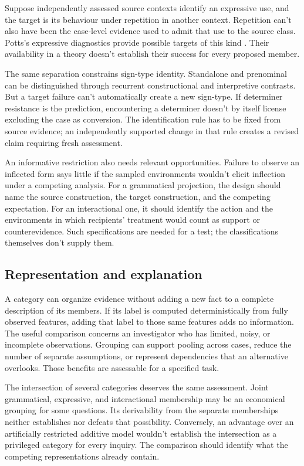 Suppose independently assessed source contexts identify an expressive
use, and the target is its behaviour under repetition in another context.
Repetition can't also have been the case-level evidence used to admit that
use to the source class. Potts's expressive diagnostics provide possible
targets of this kind \citep[166--167]{potts2007}. Their availability in a
theory doesn't establish their success for every proposed member.

The same separation constrains sign-type identity. Standalone and
prenominal  can be distinguished through recurrent
constructional and interpretive contrasts. But a target failure can't
automatically create a new sign-type. If determiner resistance is the
prediction, encountering a determiner doesn't by itself license excluding
the case as conversion. The identification rule has to be fixed from
source evidence; an independently supported change in that rule creates
a revised claim requiring fresh assessment.

An informative restriction also needs relevant opportunities. Failure
to observe an inflected form says little if the sampled environments
wouldn't elicit inflection under a competing analysis. For a grammatical
projection, the design should name the source construction, the target
construction, and the competing expectation. For an interactional one,
it should identify the action and the environments in which recipients'
treatment would count as support or counterevidence. Such specifications
are needed for a test; the classifications themselves don't supply them.

\subsection{Representation and explanation}

A category can organize evidence without adding a new fact to a complete
description of its members. If its label is computed deterministically from
fully observed features, adding that label to those same features adds no
information. The useful comparison concerns an investigator who has limited,
noisy, or incomplete observations. Grouping can support pooling across cases,
reduce the number of separate assumptions, or represent dependencies that
an alternative overlooks. Those benefits are assessable for a specified task.

The intersection of several categories deserves the same assessment.
Joint grammatical, expressive, and interactional membership may be an
economical grouping for some questions. Its derivability from the separate
memberships neither establishes nor defeats that possibility. Conversely,
an advantage over an artificially restricted additive model wouldn't
establish the intersection as a privileged category for every inquiry.
The comparison should identify what the competing representations already
contain.

